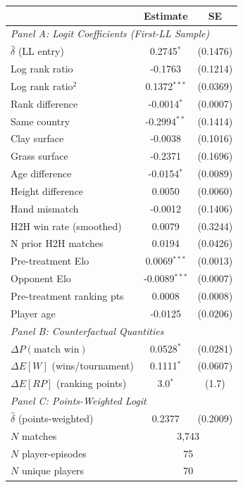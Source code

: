 \begin{tabular}{lcc}
\toprule
 & Estimate & SE \\
\midrule
\multicolumn{3}{l}{\textit{Panel A: Logit Coefficients (First-LL Sample)}} \\[3pt]
$\hat{\delta}$ (LL entry) & 0.2745$^{*}$ & (0.1476) \\
Log rank ratio & -0.1763 & (0.1214) \\
Log rank ratio$^2$ & 0.1372$^{***}$ & (0.0369) \\
Rank difference & -0.0014$^{*}$ & (0.0007) \\
Same country & -0.2994$^{**}$ & (0.1414) \\
Clay surface & -0.0038 & (0.1016) \\
Grass surface & -0.2371 & (0.1696) \\
Age difference & -0.0154$^{*}$ & (0.0089) \\
Height difference & 0.0050 & (0.0060) \\
Hand mismatch & -0.0012 & (0.1406) \\
H2H win rate (smoothed) & 0.0079 & (0.3244) \\
N prior H2H matches & 0.0194 & (0.0426) \\
Pre-treatment Elo & 0.0069$^{***}$ & (0.0013) \\
Opponent Elo & -0.0089$^{***}$ & (0.0007) \\
Pre-treatment ranking pts & 0.0008 & (0.0008) \\
Player age & -0.0125 & (0.0206) \\
\midrule
\multicolumn{3}{l}{\textit{Panel B: Counterfactual Quantities}} \\[3pt]
$\Delta P(\text{match win})$ & 0.0528$^{*}$ & (0.0281) \\
$\Delta E[W]$ (wins/tournament) & 0.1111$^{*}$ & (0.0607) \\
$\Delta E[RP]$ (ranking points) & 3.0$^{*}$ & (1.7) \\
\midrule
\multicolumn{3}{l}{\textit{Panel C: Points-Weighted Logit}} \\[3pt]
$\hat{\delta}$ (points-weighted) & 0.2377 & (0.2009) \\
\midrule
$N$ matches & \multicolumn{2}{c}{3,743} \\
$N$ player-episodes & \multicolumn{2}{c}{75} \\
$N$ unique players & \multicolumn{2}{c}{70} \\
\bottomrule
\end{tabular}
